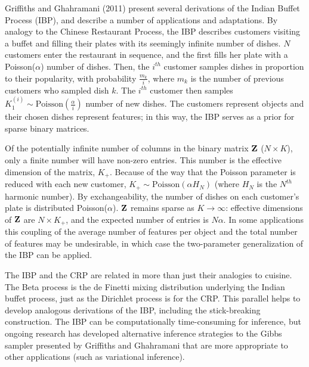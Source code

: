 \documentclass[12pt,letterpaper]{article}
\begin{document}



Griffiths and Ghahramani (2011) present several derivations of the Indian Buffet Process (IBP), and describe a number of applications and adaptations. By analogy to the Chinese Restaurant Process, the IBP describes customers visiting a buffet and filling their plates with its seemingly infinite number of dishes. $N$ customers enter the restaurant in sequence, and the first fills her plate with a Poisson($\alpha$) number of dishes. Then, the $i^{th}$ customer samples dishes in proportion to their popularity, with probability $\frac{m_k}{i}$, where $m_k$ is the number of previous customers who sampled dish $k$. The $i^{th}$ customer then samples $K^{(i)}_1 \sim \text{Poisson}(\frac{\alpha}{i})$ number of new dishes. The customers represent objects and their chosen dishes represent features; in this way, the IBP serves as a prior for sparse binary matrices. 

Of the potentially infinite number of columns in the binary matrix $\bf{Z}$ ($N \times K$), only a finite number will have non-zero entries. This number is the effective dimension of the matrix, $K_+$. Because of the way that the Poisson parameter is reduced with each new customer, $K_+ \sim \text{Poisson}(\alpha H_N)$ (where $H_N$ is the $N^{th}$ harmonic number). By exchangeability, the number of dishes on each customer's plate is distributed Poisson($\alpha$). $\bf{Z}$ remains sparse as $K\rightarrow \infty$: effective dimensions of $\bf{Z}$ are $N \times K_+$, and the expected number of entries is $N\alpha$. In some applications this coupling of the average number of features per object and the total number of features may be undesirable, in which case the two-parameter generalization of the IBP can be applied. 

The IBP and the CRP are related in more than just their analogies to cuisine. The Beta process is the de Finetti mixing distribution underlying the Indian buffet process, just as the Dirichlet process is for the CRP. This parallel helps to develop analogous derivations of the IBP, including the stick-breaking construction. The IBP can be computationally time-consuming for inference, but ongoing research has developed alternative inference strategies to the Gibbs sampler presented by Griffiths and Ghahramani that are more appropriate to other applications (such as variational inference). 
\end{document}
